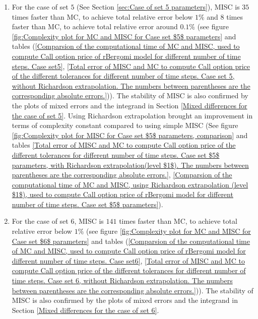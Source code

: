 \documentclass[11pt]{article}
\begin{document}
\begin{itemize}
\begin{enumerate}
		\item  For the case of set $5$ (See Section \ref{sec:Case of set 5 parameters}), MISC is  $35$ times faster than MC, to achieve total relative error below $1\%$ and $8$ times faster than MC, to achieve total relative error around $0.1\%$ (see figure \ref{fig:Complexity plot for MC and MISC for Case set $5$ parameters} and tables (\ref{Comparsion of the computational time of  MC and MISC, used to compute Call option price of rBergomi model for different number of time steps. Case set5}, \ref{Total error of MISC and MC to compute Call option price of the different tolerances for different number of time steps. Case set 5, without Richardson extrapolation. The numbers between parentheses are the corresponding absolute errors.})). The stability of MISC is also confirmed by the plots of mixed errors and the integrand in Section \ref{Mixed differences for the case of set 5}. Using Richardson extrapolation brought an improvement in terms of complexity constant compared to using simple MISC (See figure \ref{fig:Complexity plot for  MISC for Case set $5$ parameters, comparison} and tables \ref{Total  error of MISC and MC to compute Call option price of the different tolerances for different number of time steps. Case set $5$ parameters, with Richardson extrapolation(level $1$). The numbers between parentheses are the corresponding absolute errors.}, \ref{Comparsion of the computational time of  MC and MISC, using Richardson extrapolation (level $1$), used to compute Call option price of rBergomi model for different number of time steps. Case set $5$ parameters}).
				
	 \item For the case of set $6$, MISC is  $141$ times faster than MC, to achieve total relative error below $1\%$ (see figure \ref{fig:Complexity plot for MC and MISC for Case set $6$ parameters} and tables (\ref{Comparsion of the computational time of  MC and MISC, used to compute Call option price of rBergomi model for different number of time steps. Case set6}, \ref{Total error of MISC and MC to compute Call option price of the different tolerances for different number of time steps. Case set 6, without Richardson extrapolation. The numbers between parentheses are the corresponding absolute errors.})). The stability of MISC is also confirmed by the plots of mixed errors and the integrand in Section \ref{Mixed differences for the case of set 6}.
		

\end{enumerate}
\end{itemize}
\end{document}
